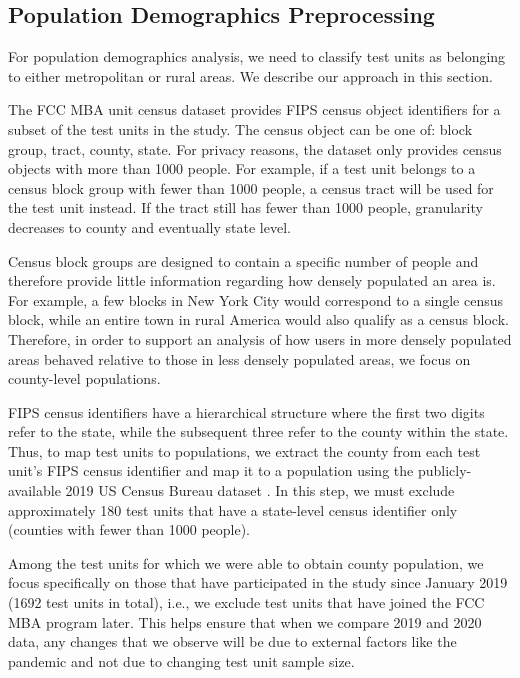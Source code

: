 \documentclass[conference,10pt]{IEEEtran}
\begin{document}
\subsection{Population Demographics Preprocessing}

For population demographics analysis, we need to classify test units as belonging to either metropolitan or rural areas. We describe our approach in this section.

The \gls{FCC} \gls{MBA} unit census dataset provides \gls{FIPS} census object identifiers for a subset of the test units in the study. The census object can be one of: block group, tract, county, state. For privacy reasons, the dataset only provides census objects with more than 1000 people. For example, if a test unit belongs to a census block group with fewer than 1000 people, a census tract will be used for the test unit instead. If the tract still has fewer than 1000 people, granularity decreases to county and eventually state level.

Census block groups are designed to contain a specific number of people and therefore provide little information regarding how densely populated an area is. For example, a few blocks in New York City would correspond to a single census block, while an entire town in rural America would also qualify as a census block. Therefore, in order to support an analysis of how users in more densely populated areas behaved relative to those in less densely populated areas, we focus on county-level populations.

\gls{FIPS} census identifiers have a hierarchical structure where the first two digits refer to the state, while the subsequent three refer to the county within the state. Thus, to map test units to populations, we extract the county from each test unit's \gls{FIPS} census identifier and map it to a population using the publicly-available 2019 \gls{US} Census Bureau dataset \cite{census}. In this step, we must exclude approximately 180 test units that have a state-level census identifier only (counties with fewer than 1000 people).

Among the test units for which we were able to obtain county population, we focus specifically on those that have participated in the study since January 2019 (1692 test units in total), i.e., we exclude test units that have joined the \gls{FCC} \gls{MBA} program later. This helps ensure that when we compare 2019 and 2020 data, any changes that we observe will be due to external factors like the pandemic and not due to changing test unit sample size.
\end{document}
